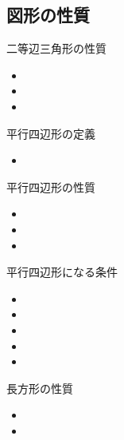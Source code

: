 \documentclass[10pt]{jsarticle}
\begin{document}
\subsection{図形の性質}
\begin{itembox}[l]{二等辺三角形の性質}
	\begin{Large}
		\begin{itemize}
			\item
			\item
			\item
		\end{itemize}
	\end{Large}
\end{itembox}

\begin{itembox}[l]{平行四辺形の定義}
	\begin{Large}
		\begin{itemize}
			\item
		\end{itemize}
	\end{Large}
\end{itembox}

\begin{itembox}[l]{平行四辺形の性質}
	\begin{Large}
		\begin{itemize}
			\item
			\item
			\item
		\end{itemize}
	\end{Large}
\end{itembox}

\begin{itembox}[l]{平行四辺形になる条件}
	\begin{Large}
		\begin{itemize}
			\item
			\item
			\item
			\item
			\item
		\end{itemize}
	\end{Large}
\end{itembox}

\begin{itembox}[l]{長方形の性質}
	\begin{Large}
		\begin{itemize}
			\item
			\item
		\end{itemize}
	\end{Large}
\end{itembox}
\end{document}
